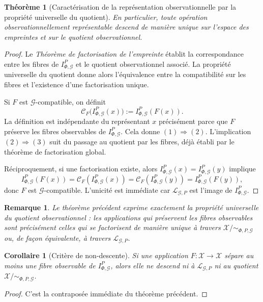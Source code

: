 \documentclass[11pt,a4paper]{article}
\newtheorem{theorem}{Théorème}
\newtheorem{corollary}{Corollaire}
\newtheorem{remark}{Remarque}
\begin{document}
\begin{appendices}
\begin{theorem}[Caractérisation de la représentation observationnelle par la propriété universelle du quotient]
En particulier, toute opération observationnellement représentable descend de manière unique sur l'espace des empreintes et sur le quotient observationnel.
\end{theorem}

\begin{proof}
Le \emph{Théorème de factorisation de l'empreinte} établit la correspondance entre les fibres de \(I_{\Phi,\mathcal G}^P\) et le quotient observationnel associé. La propriété universelle du quotient donne alors l'équivalence entre la compatibilité sur les fibres et l'existence d'une factorisation unique.

Si \(F\) est \(\mathcal G\)-compatible, on définit
\[
\mathcal C_F\bigl(I_{\Phi,\mathcal G}^P(x)\bigr):=I_{\Phi,\mathcal G}^P(F(x)).
\]
La définition est indépendante du représentant \(x\) précisément parce que \(F\) préserve les fibres observables de \(I_{\Phi,\mathcal G}^P\). Cela donne \((1)\Rightarrow(2)\). L'implication \((2)\Rightarrow(3)\) suit du passage au quotient par les fibres, déjà établi par le théorème de factorisation global.

Réciproquement, si une factorisation existe, alors \(I_{\Phi,\mathcal G}^P(x)=I_{\Phi,\mathcal G}^P(y)\) implique
\[
I_{\Phi,\mathcal G}^P(F(x))
=
\mathcal C_F(I_{\Phi,\mathcal G}^P(x))
=
\mathcal C_F(I_{\Phi,\mathcal G}^P(y))
=
I_{\Phi,\mathcal G}^P(F(y)),
\]
donc \(F\) est \(\mathcal G\)-compatible. L'unicité est immédiate car \(\mathcal L_{\mathcal G,P}\) est l'image de \(I_{\Phi,\mathcal G}^P\).
\end{proof}

\begin{remark}
Le théorème précédent exprime exactement la propriété universelle du quotient observationnel : les applications qui préservent les fibres observables sont précisément celles qui se factorisent de manière unique à travers \(\mathcal X/{\sim_{\Phi,P,\mathcal G}}\) ou, de façon équivalente, à travers \(\mathcal L_{\mathcal G,P}\).
\end{remark}

\begin{corollary}[Critère de non-descente]
Si une application \(F:\mathcal X\to\mathcal X\) sépare au moins une fibre observable de \(I_{\Phi,\mathcal G}^P\), alors elle ne descend ni à \(\mathcal L_{\mathcal G,P}\) ni au quotient \(\mathcal X/{\sim_{\Phi,P,\mathcal G}}\).
\end{corollary}

\begin{proof}
C'est la contraposée immédiate du théorème précédent.
\end{proof}


\end{appendices}
\end{document}
